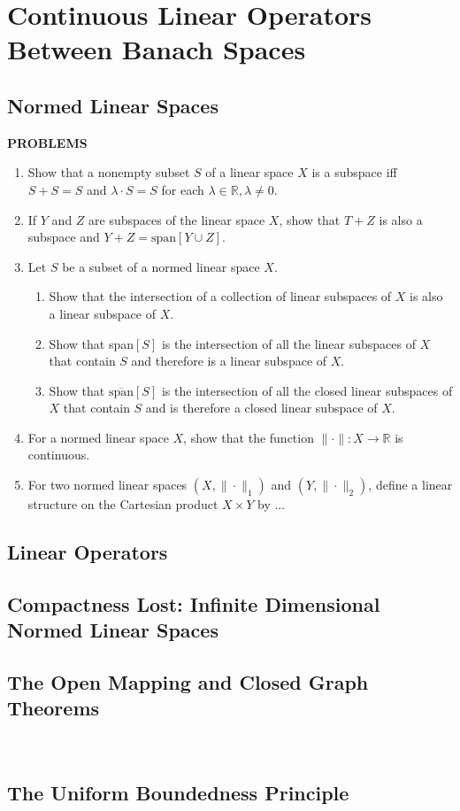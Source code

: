 \chapter{Continuous Linear Operators Between Banach Spaces}

\section{Normed Linear Spaces}
\begin{center}
	\textbf{PROBLEMS}
\end{center}
\begin{enumerate}
	\setcounter{enumi}{0}
    \item Show that a nonempty subset $S$ of a linear space $X$ is a subspace iff $S+S=S$ and $\lambda \cdot S=S$ for each $\lambda\in\mathbb{R},\lambda\neq0$.
    \item If $Y$ and $Z$ are subspaces of the linear space $X$, show that $T+Z$ is also a subspace and $Y+Z=\text{span}[Y\cup Z]$. 
    \item Let $S$ be a subset of a normed linear space $X$.
    \begin{enumerate}[label=(\roman*),align=left]
        \item Show that the intersection of a collection of linear subspaces of $X$ is also a linear subspace of $X$.
        \item Show that span$[S]$ is the intersection of all the linear subspaces of $X$ that contain $S$ and therefore is a linear subspace of $X$.
        \item Show that $\overline{\text{span}}[S]$ is the intersection of all the closed linear subspaces of $X$ that contain $S$ and is therefore a closed linear subspace of $X$. 
    \end{enumerate}
    \item For a normed linear space $X$, show that the function $\|\cdot\|:X\to\mathbb{R}$ is continuous.
    \item For two normed linear spaces $(X,\|\cdot\|_1)$ and $(Y,\|\cdot\|_2)$, define a linear structure on the Cartesian product $X\times Y$ by ...
\end{enumerate}

\section{Linear Operators}

\section{Compactness Lost: Infinite Dimensional Normed Linear Spaces}

\section{The Open Mapping and Closed Graph Theorems}\

\section{The Uniform Boundedness Principle}

